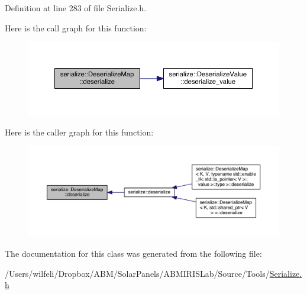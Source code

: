 Definition at line 283 of file Serialize.\+h.



Here is the call graph for this function\+:\nopagebreak
\begin{figure}[H]
\begin{center}
\leavevmode
\includegraphics[width=350pt]{classserialize_1_1_deserialize_map_af4827270beb08c018e840b9cec766cde_cgraph}
\end{center}
\end{figure}




Here is the caller graph for this function\+:
\nopagebreak
\begin{figure}[H]
\begin{center}
\leavevmode
\includegraphics[width=350pt]{classserialize_1_1_deserialize_map_af4827270beb08c018e840b9cec766cde_icgraph}
\end{center}
\end{figure}




The documentation for this class was generated from the following file\+:\begin{DoxyCompactItemize}
\item 
/\+Users/wilfeli/\+Dropbox/\+A\+B\+M/\+Solar\+Panels/\+A\+B\+M\+I\+R\+I\+S\+Lab/\+Source/\+Tools/\hyperlink{_serialize_8h}{Serialize.\+h}\end{DoxyCompactItemize}
